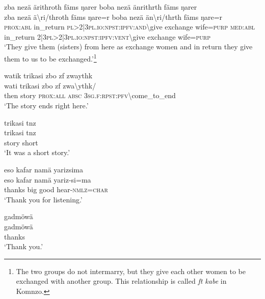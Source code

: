 \ea\label{ex:3:a7618}
zba nezä ärithroth fäms ŋarer boba nezä änrithrth fäms ŋarer\\
\gll zba	nezä	ä{\textbackslash}ri/throth	fäms	ŋare=r	boba	nezä	än{\textbackslash}ri/thrth	fäms	ŋare=r\\
     \textsc{prox}:\textsc{abl}	in\_return	\textsc{pl}>2|3\textsc{pl}.\textsc{io}:\textsc{npst}:\textsc{ipfv}:\textsc{and}{\textbackslash}give	exchange	wife=\textsc{purp}	\textsc{med}:\textsc{abl}	in\_return	2|3\textsc{pl}>2|3\textsc{pl}.\textsc{io}:\textsc{npst}:\textsc{ipfv}:\textsc{vent}{\textbackslash}give	exchange	wife=\textsc{purp}\\
\newpage
\glt `They give them (sisters) from here as exchange women and in return they give them to us to be exchanged.'\footnote{The two groups do not intermarry, but they give each other women to be exchanged with another group. This relationship is called \textit{ft kabe} in Komnzo.}
\z

\ea\label{ex:3:a7621}
watik trikasi zbo zf zwaythk\\
\gll wati	trikasi	zbo	zf	zwa{\textbackslash}ythk/\\
     then	story	\textsc{prox}:\textsc{all}	\textsc{absc}	3\textsc{sg}.\textsc{f}:\textsc{rpst}:\textsc{pfv}{\textbackslash}come\_to\_end\\
\glt `The story ends right here.'
\z

\ea\label{ex:3:a7622}
trikasi tnz\\
\gll trikasi	tnz\\
     story	short\\
\glt `It was a short story.'
\z

\ea\label{ex:3:a7623}
eso kafar namä yarizsima\\
\gll eso	kafar	namä	yariz-si=ma\\
     thanks	big	good	hear-\textsc{nmlz}=\textsc{char}\\
\glt `Thank you for listening.'
\z

\ea\label{ex:3:a7625}
gadmöwä\\
\gll gadmöwä\\
     thanks\\
\glt `Thank you.'
\z
